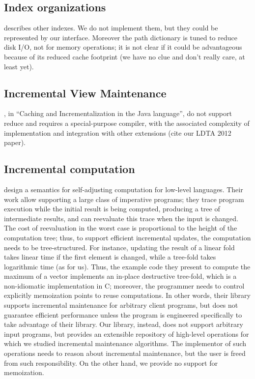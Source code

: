 \documentclass[preprint,authoryear,10pt]{sigplanconf}
\begin{document}
\subsection{Index organizations}

\citet{Lee98} describes other indexes. We do not implement them, but
they could be represented by our interface. Moreover the path dictionary
is tuned to reduce disk I/O, not for memory operations; it is not clear
if it could be advantageous because of its reduced cache footprint (we
have no clue and don't really care, at least yet).

\subsection{Incremental View Maintenance}

\citet{Willis08}, in ``Caching and Incrementalization in the Java
language'', do not support reduce and requires a special-purpose
compiler, with the associated complexity of implementation and
integration with other extensions (cite our LDTA 2012 paper).

\subsection{Incremental computation}

\citet{Hammer11} design a semantics for self-adjusting computation for
low-level languages. Their work allow supporting a large class of
imperative programs; they trace program execution while the initial
result is being computed, producing a tree of intermediate results, and
can reevaluate this trace when the input is changed. The cost of
reevaluation in the worst case is proportional to the height of the
computation tree; thus, to support efficient incremental updates, the
computation needs to be tree-structured. For instance, updating the
result of a linear fold takes linear time if the first element is
changed, while a tree-fold takes logarithmic time (as for us). Thus, the
example code they present to compute the maximum of a vector implements
an in-place destructive tree-fold, which is a non-idiomatic
implementation in C; moreover, the programmer needs to control
explicitly memoization points to reuse computations. In other words,
their library supports incremental maintenance for arbitrary client
programs, but does not guarantee efficient performance unless the
program is engineered specifically to take advantage of their library.
Our library, instead, does not support arbitrary input programs, but
provides an extensible repository of high-level operations for which we
studied incremental maintenance algorithms. The implementor of such
operations needs to reason about incremental maintenance, but the user
is freed from such responsibility. On the other hand, we provide no
support for memoization.
\end{document}
